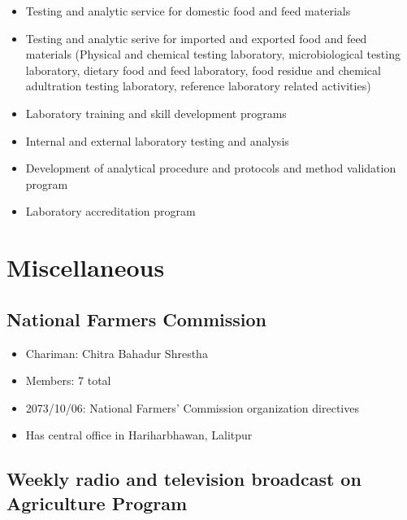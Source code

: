 \documentclass[
  openany]{book}
\providecommand{\tightlist}{%
  \setlength{\itemsep}{0pt}\setlength{\parskip}{0pt}}
\begin{document}
\begin{itemize}
  \begin{itemize}
  \tightlist
  \item
    Testing and analytic service for domestic food and feed materials
  \item
    Testing and analytic serive for imported and exported food and feed materials (Physical and chemical testing laboratory, microbiological testing laboratory, dietary food and feed laboratory, food residue and chemical adultration testing laboratory, reference laboratory related activities)
  \item
    Laboratory training and skill development programs
  \item
    Internal and external laboratory testing and analysis
  \item
    Development of analytical procedure and protocols and method validation program
  \item
    Laboratory accreditation program
  \end{itemize}
\end{itemize}

\hypertarget{miscellaneous}{%
\section{Miscellaneous}\label{miscellaneous}}

\hypertarget{national-farmers-commission}{%
\subsection{National Farmers Commission}\label{national-farmers-commission}}

\begin{itemize}
\tightlist
\item
  Chariman: Chitra Bahadur Shrestha
\item
  Members: 7 total
\item
  2073/10/06: National Farmers' Commission organization directives
\item
  Has central office in Hariharbhawan, Lalitpur
\end{itemize}

\hypertarget{weekly-radio-and-television-broadcast-on-agriculture-program}{%
\subsection{Weekly radio and television broadcast on Agriculture Program}\label{weekly-radio-and-television-broadcast-on-agriculture-program}}
\end{document}
